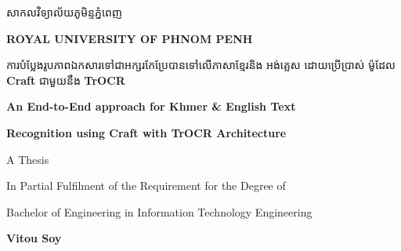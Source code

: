 \begin{titlepage}
    \centering
    \vspace*{1cm}

    \centering
    \begin{minipage}{0.9\textwidth}
        \centering
        {\khmerfont\fontsize{16pt}{20pt}\selectfont សាកលវិទ្យាល័យភូមិន្ទភ្នំពេញ\\[0.6em] \par}
        {\englishfont\fontsize{12.5pt}{20pt}\selectfont\bfseries\textbf{ROYAL UNIVERSITY OF PHNOM PENH}}
    \end{minipage}
    

    \vspace{2cm}

    \begin{minipage}{0.9\textwidth}
        \centering
        {\khmerfont\fontsize{14pt}{20pt}\selectfont ការបំប្លែងរូបភាពឯកសារទៅជាអក្សរកែប្រែបានទៅលើភាសាខ្មែរនិង អង់គ្លេស ដោយប្រើប្រាស់ ម៉ូដែល {\englishfont\textbf{Craft}} ជាមួយនឹង {\englishfont\textbf{TrOCR}}\\[0.4em]}
        {\englishfont\fontsize{14pt}{20pt}\selectfont\bfseries An End-to-End approach for Khmer \& English Text \par}
        {\englishfont\fontsize{14pt}{20pt}\selectfont\bfseries Recognition using Craft with TrOCR Architecture \par}
    \end{minipage}

    \vspace{3.0cm}

    {\englishfont\fontsize{14pt}{20pt}\selectfont A Thesis\par}
    \vspace{0.5cm}
    {\englishfont\fontsize{13pt}{20pt}\selectfont\large In Partial Fulfilment of the Requirement for the Degree of\par}
    {\englishfont\fontsize{13pt}{20pt}\selectfont\large Bachelor of Engineering in Information Technology Engineering\par}
    

    \vspace{3.0cm}

    {\englishfont\fontsize{14pt}{20pt}\bfseries\textbf\selectfont Vitou Soy\par}

    

    

    \vspace{2.5cm}


\end{titlepage}
